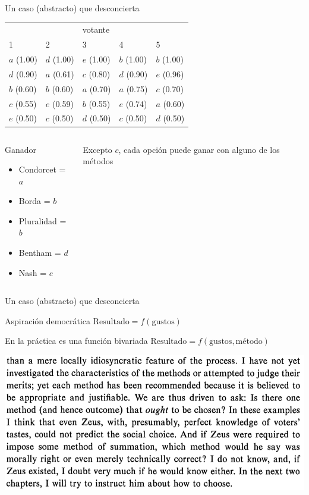 \documentclass[bigger]{beamer}
\begin{document}
\begin{frame}[label={sec:org3f1943e}]{Un caso (abstracto) que desconcierta}
\begin{center}
\begin{tabular}{lllll}
 &  & votante &  & \\[0pt]
1 & 2 & 3 & 4 & 5\\[0pt]
\hline
\(a\) (1.00) & \(d\) (1.00) & \(e\) (1.00) & \(b\) (1.00) & \(b\) (1.00)\\[0pt]
\(d\) (0.90) & \(a\) (0.61) & \(c\) (0.80) & \(d\) (0.90) & \(e\) (0.96)\\[0pt]
\(b\) (0.60) & \(b\) (0.60) & \(a\) (0.70) & \(a\) (0.75) & \(c\) (0.70)\\[0pt]
\(c\) (0.55) & \(e\) (0.59) & \(b\) (0.55) & \(e\) (0.74) & \(a\) (0.60)\\[0pt]
\(e\) (0.50) & \(c\) (0.50) & \(d\) (0.50) & \(c\) (0.50) & \(d\) (0.50)\\[0pt]
\end{tabular}
\end{center}
\pause 
\begin{columns}
\begin{column}{0.4\columnwidth}
\begin{block}{Ganador}
\begin{itemize}
\item Condorcet = \(a\)
\item Borda = \(b\)
\item Pluralidad = \(b\)
\item Bentham = \(d\)
\item Nash = \(e\)
\end{itemize}
\end{block}
\end{column}
\begin{column}{0.4\columnwidth}
Excepto \(c\), cada opción puede ganar con alguno de los métodos
\end{column}
\end{columns}
\end{frame}
\begin{frame}[label={sec:orge48ebae}]{Un caso (abstracto) que desconcierta}
\begin{block}{Aspiración democrática}
\centering
\(\text{Resultado} = f(\text{gustos})\)
\end{block}
\begin{block}{En la práctica es una función bivariada}
\centering
\(\text{Resultado} = f(\text{gustos}, \text{método})\)
\end{block}
\pause \bigskip
\includegraphics[width=\textwidth]{./pics/rk7.png}
\end{frame}
\end{document}
